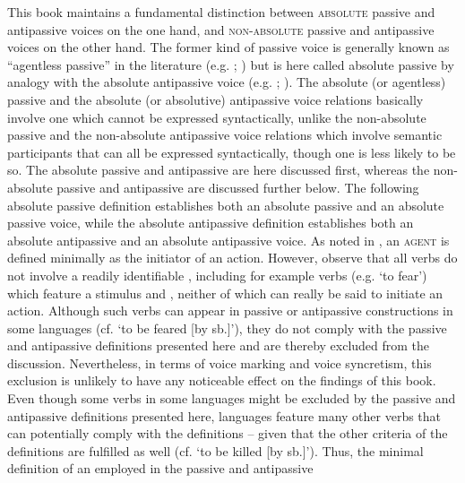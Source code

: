 \smallskip

This book maintains a fundamental distinction between \textsc{absolute} passive and antipassive voices on the one hand, and \textsc{non-absolute} passive and antipassive voices on the other hand. The former kind of passive voice is generally known as “agentless passive” in the literature (e.g. \citealt[7]{dixon:aikhenvald:2000}; \citealt[374]{kulikov:2010}) but is here called absolute passive by analogy with the absolute antipassive voice (e.g. \citealt[1131]{haspelmath:muller-bardey:2004}; \citealt[98]{malchukov:2015}). The absolute (or agentless) passive and the absolute (or absolutive) antipassive voice relations basically involve one  which cannot be expressed syntactically, unlike the non-absolute passive and the non-absolute antipassive voice relations which involve semantic participants that can all be expressed syntactically, though one  is less likely to be so. The absolute passive and antipassive are here discussed first, whereas the non-absolute passive and antipassive are discussed further below. The following absolute passive definition establishes both an absolute passive  and an absolute passive voice, while the absolute antipassive definition establishes both an absolute antipassive  and an absolute antipassive voice. As noted in , an \textsc{agent} is defined minimally as the initiator of an action. However, observe that all verbs do not involve a readily identifiable , including for example  verbs (e.g. ‘to fear’) which feature a stimulus and , neither of which can really be said to initiate an action. Although such verbs can appear in  passive or antipassive constructions in some languages (cf.   ‘to be feared [by sb.]’), they do not comply with the passive and antipassive definitions presented here and are thereby excluded from the discussion. Nevertheless, in terms of voice marking and voice syncretism, this exclusion is unlikely to have any noticeable effect on the findings of this book. Even though some verbs in some languages might be excluded by the passive and antipassive definitions presented here, languages feature many other verbs that can potentially comply with the definitions -- given that the other criteria of the definitions are fulfilled as well (cf.   ‘to be killed [by sb.]’). Thus, the minimal definition of an  employed in the passive and antipassive 